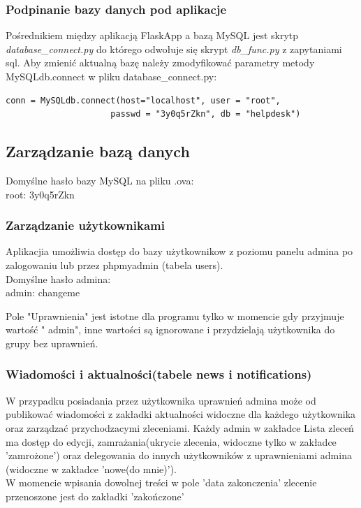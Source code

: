 \documentclass[12pt,a4paper]{article}
\begin{document}
\subsubsection{Podpinanie bazy danych pod aplikacje}
Pośrednikiem między aplikacją FlaskApp a bazą MySQL jest skrytp \textit{database\_connect.py} do którego odwołuje się skrypt \textit{db\_func.py} z zapytaniami sql. Aby zmienić aktualną bazę należy zmodyfikować parametry metody MySQLdb.connect w pliku database\_connect.py:
\begin{lstlisting}
conn = MySQLdb.connect(host="localhost", user = "root",
                     passwd = "3y0q5rZkn", db = "helpdesk")
\end{lstlisting}

\subsection{Zarządzanie bazą danych}
Domyślne hasło bazy MySQL na pliku .ova:\\
root: 3y0q5rZkn

\subsubsection{Zarządzanie użytkownikami}
\quad
Aplikacjia umożliwia dostęp do bazy użytkownikow z poziomu panelu admina po zalogowaniu lub przez phpmyadmin (tabela users). \\

Domyślne hasło admina:\\
admin: changeme

Pole "Uprawnienia" jest istotne dla programu tylko w momencie gdy przyjmuje wartość " admin", inne wartości są ignorowane i przydzielają użytkownika do grupy bez uprawnień.\\

\subsubsection{Wiadomości i aktualności(tabele news i notifications)}
\quad
W przypadku posiadania przez użytkownika uprawnień admina może od publikować wiadomości z zakładki aktualności widoczne dla każdego użytkownika oraz zarządzać przychodzacymi zleceniami.
Każdy admin w zakładce Lista zleceń ma dostęp do edycji, zamrażania(ukrycie zlecenia, widoczne tylko w zakładce 'zamrożone') oraz delegowania do innych użytkowników z uprawnieniami admina (widoczne w zakładce 'nowe(do mnie)').\\

W momencie wpisania dowolnej treści w pole 'data zakonczenia' zlecenie przenoszone jest do zakładki 'zakończone'
  
\end{document}
